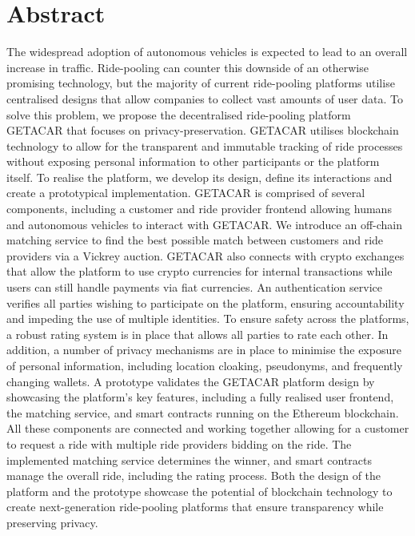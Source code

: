 \documentclass[
  a4paper,  %
  twoside,  %
  bibliography=totoc,
  headsepline,
  cleardoublepage=empty,
  parskip=half,
  draft=false
]{scrbook}
\begin{document}
  \section*{Abstract}
The widespread adoption of autonomous vehicles is expected to lead to an overall increase in traffic. Ride-pooling can counter this downside of an otherwise promising technology, but the majority of current ride-pooling platforms utilise centralised designs that allow companies to collect vast amounts of user data. To solve this problem, we propose the decentralised ride-pooling platform GETACAR that focuses on privacy-preservation. GETACAR utilises blockchain technology to allow for the transparent and immutable tracking of ride processes without exposing personal information to other participants or the platform itself. To realise the platform, we develop its design, define its interactions and create a prototypical implementation. GETACAR is comprised of several components, including a customer and ride provider frontend allowing humans and autonomous vehicles to interact with GETACAR. We introduce an off-chain matching service to find the best possible match between customers and ride providers via a Vickrey auction.  GETACAR also connects with crypto exchanges that allow the platform to use crypto currencies for internal transactions while users can still handle payments via fiat currencies.
An authentication service verifies all parties wishing to participate on the platform, ensuring accountability and impeding the use of multiple identities.  To ensure safety across the platforms, a robust rating system is in place that allows all parties to rate each other. In addition, a number of privacy mechanisms are in place to minimise the exposure of personal information, including location cloaking, pseudonyms, and frequently changing wallets. A prototype validates the GETACAR platform design by showcasing the platform's key features, including a fully realised user frontend, the matching service, and smart contracts running on the Ethereum blockchain. All these components are connected and working together allowing for a customer to request a ride with multiple ride providers bidding on the ride. The implemented matching service determines the winner, and smart contracts manage the overall ride, including the rating process. Both the design of the platform and the prototype showcase the potential of blockchain technology to create next-generation ride-pooling platforms that ensure transparency while preserving privacy.

\cleardoublepage
\end{document}
